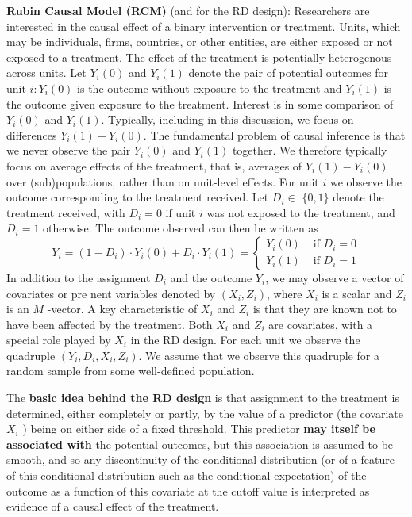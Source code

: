 \documentclass[11pt]{book}%
\begin{document}
\textbf{Rubin Causal Model (RCM) }(and for the RD design): Researchers are interested in the causal effect of a binary intervention or treatment. Units, which may be individuals, firms, countries, or other entities, are either exposed or not exposed to a treatment. The effect of the treatment is potentially heterogenous across units. Let $Y_{i}(0)$ and $Y_{i}(1)$ denote the pair of potential outcomes for unit $i: Y_{i}(0)$ is the outcome without exposure to the treatment and $Y_{i}(1)$ is the outcome given exposure to the treatment. Interest is in some comparison of $Y_{i}(0)$ and $Y_{i}(1) .$ Typically, including in this discussion, we focus on differences $Y_{i}(1)-Y_{i}(0) .$ The fundamental problem of causal inference is that we never observe the pair $Y_{i}(0)$ and $Y_{i}(1)$ together. We therefore typically focus on average effects of the treatment, that is, averages of $Y_{i}(1)-Y_{i}(0)$ over (sub)populations, rather than on unit-level effects. For unit $i$ we observe the outcome corresponding to the treatment received. Let $D_{i} \in$ $\{0,1\}$ denote the treatment received, with $D_{i}=0$ if unit $i$ was not exposed to the treatment, and $D_{i}=1$ otherwise. The outcome observed can then be written as
$$
Y_{i}=\left(1-D_{i}\right) \cdot Y_{i}(0)+D_{i} \cdot Y_{i}(1)= \begin{cases}Y_{i}(0) & \text { if } D_{i}=0 \\ Y_{i}(1) & \text { if } D_{i}=1\end{cases}
$$
In addition to the assignment $D_{i}$ and the outcome $Y_{i}$, we may observe a vector of covariates or pre nent variables denoted by $\left(X_{i}, Z_{i}\right)$, where $X_{i}$ is a scalar and $Z_{i}$ is an $M$ -vector. A key characteristic of $X_{i}$ and $Z_{i}$ is that they are known not to have been affected by the treatment. Both $X_{i}$ and $Z_{i}$ are covariates, with a special role played by $X_{i}$ in the RD design. For each unit we observe the quadruple $\left(Y_{i}, D_{i}, X_{i}, Z_{i}\right) .$ We assume that we observe this quadruple for a random sample from some well-defined population.

The \textbf{basic idea behind the RD design} is that assignment to the treatment is determined, either completely or partly, by the value of a predictor (the covariate $X_{i}$ ) being on either side of a fixed threshold. This predictor\textbf{ may itself be associated with} the potential outcomes, but this association is assumed to be smooth, and so any discontinuity of the conditional distribution (or of a feature of this conditional distribution such as the conditional expectation) of the outcome as a function of this covariate at the cutoff value is interpreted as evidence of a causal effect of the treatment.
\end{document}
